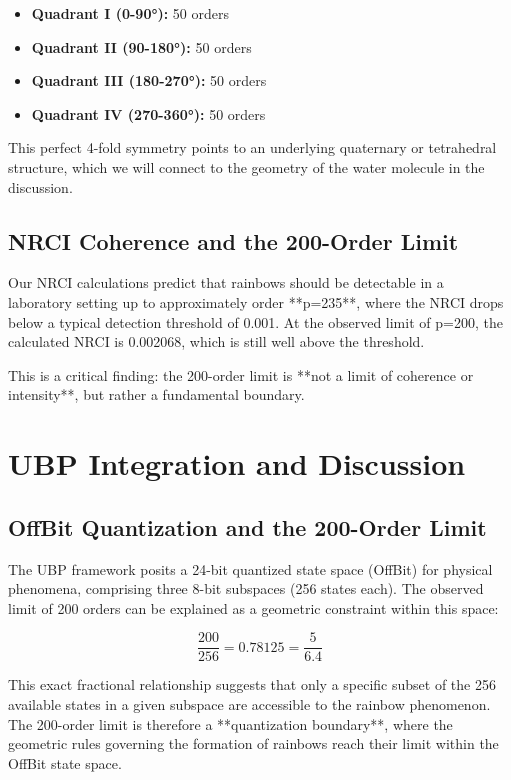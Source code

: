 \documentclass[12pt]{article}
\begin{document}
\begin{itemize}
    \item \textbf{Quadrant I (0-90°):} 50 orders
    \item \textbf{Quadrant II (90-180°):} 50 orders
    \item \textbf{Quadrant III (180-270°):} 50 orders
    \item \textbf{Quadrant IV (270-360°):} 50 orders
\end{itemize}

This perfect 4-fold symmetry points to an underlying quaternary or tetrahedral structure, which we will connect to the geometry of the water molecule in the discussion.

\subsection{NRCI Coherence and the 200-Order Limit}
Our NRCI calculations predict that rainbows should be detectable in a laboratory setting up to approximately order **p=235**, where the NRCI drops below a typical detection threshold of 0.001. At the observed limit of p=200, the calculated NRCI is 0.002068, which is still well above the threshold. 

This is a critical finding: the 200-order limit is **not a limit of coherence or intensity**, but rather a fundamental boundary.

\section{UBP Integration and Discussion}

\subsection{OffBit Quantization and the 200-Order Limit}
The UBP framework posits a 24-bit quantized state space (OffBit) for physical phenomena, comprising three 8-bit subspaces (256 states each). The observed limit of 200 orders can be explained as a geometric constraint within this space:

\begin{equation}
\frac{200}{256} = 0.78125 = \frac{5}{6.4}
\end{equation}

This exact fractional relationship suggests that only a specific subset of the 256 available states in a given subspace are accessible to the rainbow phenomenon. The 200-order limit is therefore a **quantization boundary**, where the geometric rules governing the formation of rainbows reach their limit within the OffBit state space.
\end{document}
